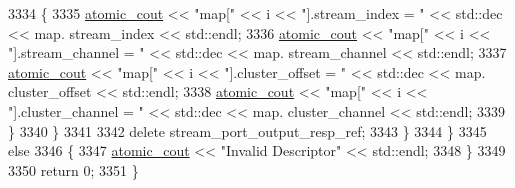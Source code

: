 \begin{DoxyCode}
3334                 \{
3335                     \hyperlink{cmd__line_8h_a0bc38ccc65c79ba06c6fcd7b4bf554c3}{atomic\_cout} << \textcolor{stringliteral}{"map["} << i << \textcolor{stringliteral}{"].stream\_index = "} << std::dec << map.
      stream\_index << std::endl;
3336                     \hyperlink{cmd__line_8h_a0bc38ccc65c79ba06c6fcd7b4bf554c3}{atomic\_cout} << \textcolor{stringliteral}{"map["} << i << \textcolor{stringliteral}{"].stream\_channel = "} << std::dec << map.
      stream\_channel << std::endl;
3337                     \hyperlink{cmd__line_8h_a0bc38ccc65c79ba06c6fcd7b4bf554c3}{atomic\_cout} << \textcolor{stringliteral}{"map["} << i << \textcolor{stringliteral}{"].cluster\_offset = "} << std::dec << map.
      cluster\_offset << std::endl;
3338                     \hyperlink{cmd__line_8h_a0bc38ccc65c79ba06c6fcd7b4bf554c3}{atomic\_cout} << \textcolor{stringliteral}{"map["} << i << \textcolor{stringliteral}{"].cluster\_channel = "} << std::dec << map.
      cluster\_channel << std::endl;
3339                 \}
3340             \}
3341 
3342             \textcolor{keyword}{delete} stream\_port\_output\_resp\_ref;
3343         \}
3344     \}
3345     \textcolor{keywordflow}{else}
3346     \{
3347         \hyperlink{cmd__line_8h_a0bc38ccc65c79ba06c6fcd7b4bf554c3}{atomic\_cout} << \textcolor{stringliteral}{"Invalid Descriptor"} << std::endl;
3348     \}
3349 
3350     \textcolor{keywordflow}{return} 0;
3351 \}
\end{DoxyCode}


